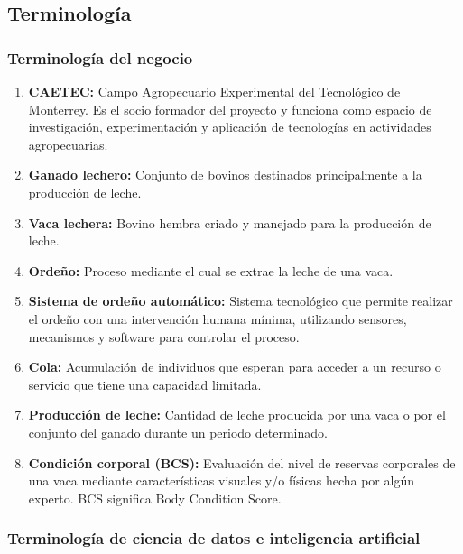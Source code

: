 \subsection{Terminología}

\subsubsection{Terminología del negocio}

\begin{enumerate}
  \item \textbf{CAETEC:} Campo Agropecuario Experimental del Tecnológico de Monterrey. Es el socio formador del proyecto y funciona como espacio de investigación, experimentación y aplicación de tecnologías en actividades agropecuarias.
  \item \textbf{Ganado lechero:} Conjunto de bovinos destinados principalmente a la producción de leche.
  \item \textbf{Vaca lechera:} Bovino hembra criado y manejado para la producción de leche.
  \item \textbf{Ordeño:} Proceso mediante el cual se extrae la leche de una vaca.
  \item \textbf{Sistema de ordeño automático:} Sistema tecnológico que permite realizar el ordeño con una intervención humana mínima, utilizando sensores, mecanismos y software para controlar el proceso.
  \item \textbf{Cola:} Acumulación de individuos que esperan para acceder a un recurso o servicio que tiene una capacidad limitada.
  \item \textbf{Producción de leche:} Cantidad de leche producida por una vaca o por el conjunto del ganado durante un periodo determinado.
  \item \textbf{Condición corporal (BCS):} Evaluación del nivel de reservas corporales de una vaca mediante características visuales y/o físicas hecha por algún experto. BCS significa Body Condition Score.
\end{enumerate}

\subsubsection{Terminología de ciencia de datos e inteligencia artificial}


